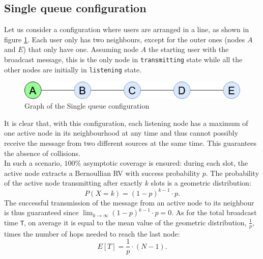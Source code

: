 \subsection{Single queue configuration}\label{ssec:singlequeue}
Let us consider a configuration where users are arranged in a line, as shown in
figure \ref{fig:single_queue_graph}. Each user only has two neighbours, except for
the outer ones (nodes $A$ and $E$) that only have one. Assuming node $A$ the
starting user with the broadcast message, this is the only node in
\texttt{transmitting} state while all the other nodes are initially in
\texttt{listening} state. 
\begin{figure}[H]
    \begin{center}
        \includegraphics[scale=0.6]{img/single_queue.png}
        \caption{Graph of the Single queue configuration}
        \label{fig:single_queue_graph}
    \end{center}
    \vspace*{-0.4cm}
\end{figure}
\noindent It is clear that, with this configuration, each listening node has a
maximum of one active node in its neighbourhood at any time and thus cannot possibly receive
the message from two different sources at the same time. This guarantees the
absence of collisions.\\
In such a scenario, $100\%$ asymptotic coverage is
ensured: during each slot, the active node extracts a Bernoullian RV with
success probability $p$. The probability of the active node transmitting after exactly
$k$ slots is a geometric distribution:
\begin{equation}
	P(X = k) = (1 - p)^{k-1} \cdot p.
	\label{geometricDistribution}
\end{equation}
The successful transmission of the message from an active node to its neighbour
is thus guaranteed since $\lim_{k \to \infty} (1 - p)^{k-1} \cdot p = 0$.
As for the total broadcast time \texttt{T}, on average it is equal to the mean
value of the geometric distribution, $\frac{1}{p}$, times the number of hops
needed to reach the last node:
\begin{equation}
	E[T] = \frac{1}{p} \cdot (N - 1).
	\label{singleQueueMeanT}
\end{equation}

